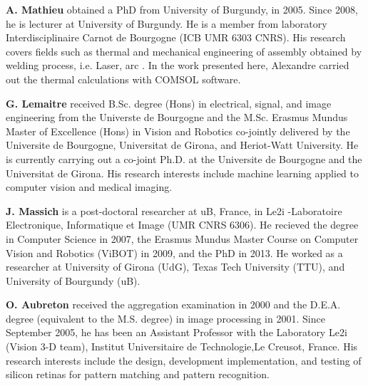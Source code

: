 \documentclass[12pt]{spieman}
\begin{document}
\begin{spacing}{2}
\vspace{2ex}\noindent\textbf{A. Mathieu} obtained a PhD from University of Burgundy, in 2005. Since 2008, he is lecturer at University of Burgundy. He is a member from laboratory Interdisciplinaire Carnot de Bourgogne (ICB UMR 6303 CNRS). His research covers fields such as thermal and mechanical engineering of assembly obtained by welding process, i.e. Laser, arc . In the work presented here, Alexandre carried out the thermal calculations with COMSOL software. 

\vspace{2ex}\noindent\textbf{G. Lemaitre} received B.Sc. degree (Hons) in electrical, signal, and image engineering from the Universte de Bourgogne and the M.Sc. Erasmus Mundus Master of Excellence (Hons) in Vision and Robotics co-jointly delivered by the Universite de Bourgogne, Universitat de Girona, and Heriot-Watt University. 
He is currently carrying out a co-joint Ph.D. at the Universite de Bourgogne and the Universitat de Girona. His research interests include machine learning applied to computer vision and medical imaging.

\vspace{2ex}\noindent\textbf{J. Massich}  is a post-doctoral researcher at uB, France, in Le2i -Laboratoire Electronique, Informatique et Image (UMR CNRS 6306).
He recieved the degree in Computer Science in 2007, the Erasmus Mundus Master Course on Computer Vision and Robotics (ViBOT) in 2009, and the PhD in 2013.
He worked as a researcher at University of Girona (UdG), Texas Tech University (TTU), and University of Bourgundy (uB).

\vspace{2ex}\noindent\textbf{O. Aubreton} received the aggregation examination in 2000 and the D.E.A. degree (equivalent to the M.S. degree) in image processing in 2001.
Since September 2005, he has been an Assistant Professor with the Laboratory Le2i (Vision
3-D team), Institut Universitaire de Technologie,Le Creusot, France. His research interests include the design, development implementation, and testing of silicon retinas for pattern matching and pattern recognition.



\newpage
\listoffigures

\newpage
\listoftables

\newpage   
\newpage   
\newpage   
\newpage   
\newpage   
\newpage   
\newpage   
\newpage   
\newpage   
\newpage  
\newpage   
\newpage   


\end{spacing}
\end{document}
